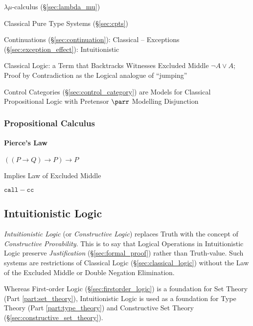 \fist $\lambda\mu$-calculus (\S\ref{sec:lambda_mu})

\fist Classical Pure Type Systems (\S\ref{sec:cpts})


Continuations (\S\ref{sec:continuation}): Classical -- Exceptions
(\S\ref{sec:exception_effect}): Intuitionistic

Classical Logic: a Term that Backtracks Witnesses Excluded Middle
$\neg A \vee A$; Proof by Contradiction as the Logical analogue of
``jumping''

Control Categories (\S\ref{sec:control_category}) are Models for
Classical Propositional Logic with Pretensor $\parr$ Modelling
Disjunction



\subsubsection{Propositional Calculus}
\label{sec:propositional_calculus}

\paragraph{Pierce's Law}\label{sec:pierces_law}\hfill

$((P \rightarrow Q) \rightarrow P) \rightarrow P$

Implies Law of Excluded Middle

$\mathtt{call-cc}$ %



\subsection{Intuitionistic Logic}\label{sec:intuitionistic_logic}

\emph{Intuitionistic Logic} (or \emph{Constructive Logic}) replaces
Truth with the concept of \emph{Constructive Provability}. This is to
say that Logical Operations in Intuitionistic Logic preserve
\emph{Justification} (\S\ref{sec:formal_proof}) rather than
Truth-value. Such systems are restrictions of Classical Logic
(\S\ref{sec:classical_logic}) without the Law of the Excluded Middle
or Double Negation Elimination.

Whereas First-order Logic (\S\ref{sec:firstorder_logic}) is a
foundation for Set Theory (Part \ref{part:set_theory}), Intuitionistic
Logic is used as a foundation for Type Theory (Part
\ref{part:type_theory}) and Constructive Set Theory
(\S\ref{sec:constructive_set_theory}).

